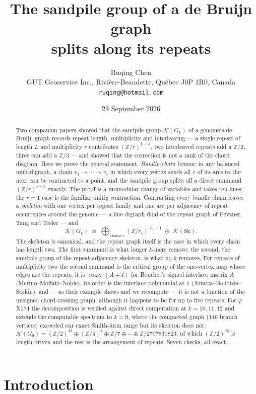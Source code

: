\documentclass[11pt]{article}
\title{\bfseries The sandpile group of a de Bruijn graph\\ splits along its repeats}
\author{Ruqing Chen\\[2pt]
\normalsize GUT Geoservice Inc., Rivi\`ere-Beaudette, Qu\'ebec J0P 1R0, Canada\\
\normalsize\texttt{ruqing@hotmail.com}}
\date{23 September 2026}
\theoremstyle{plain}
\theoremstyle{definition}
\theoremstyle{remark}
\newcommand{\Z}{\mathbb{Z}}
\newcommand{\K}{\mathcal{K}}
\newcommand{\coker}{\operatorname{coker}}
\newcommand{\Sk}{\mathrm{Sk}}
\begin{document}
\maketitle

\begin{abstract}
\noindent
Two companion papers showed that the sandpile group $\K(G_k)$ of a genome's de Bruijn
graph records repeat length, multiplicity and interleaving --- a single repeat of length
$L$ and multiplicity $r$ contributes $(\Z/r)^{L-k}$, two interleaved repeats add a $\Z/2$,
three can add a $\Z/3$ --- and showed that the correction is not a rank of the chord
diagram. Here we prove the general statement. \emph{Bundle-chain lemma:} in
any balanced multidigraph, a chain $v_1\to\cdots\to v_s$ in which every vertex sends all
$r$ of its arcs to the next can be contracted to a point, and the sandpile group splits
off a direct summand $(\Z/r)^{s-1}$ exactly. The proof is a unimodular change of
variables and takes ten lines; the $r=1$ case is the familiar unitig contraction.
Contracting every bundle chain leaves a \emph{skeleton} with one vertex per repeat family
and one arc per adjacency of repeat occurrences around the genome --- a line-digraph
dual of the repeat graph of Pevzner, Tang and Tesler --- and
\[
\K(G_k)\;\cong\;\bigoplus_{\text{chains }c}(\Z/r_c)^{\,\ell_c-1}\;\oplus\;\K(\Sk).
\]
The skeleton is canonical, and the repeat graph itself is the case in which every chain
has length two. The first summand is what longer $k$-mers remove; the second, the
sandpile group of the repeat-adjacency skeleton, is what no $k$ removes. For repeats of
multiplicity two the second summand is the critical group of the one-vertex map whose
edges are the repeats: it is $\coker(A+I)$ for Bouchet's signed interlace matrix $A$
(Merino--Moffatt--Noble), its order is the interlace polynomial at $1$
(Arratia--Bollob\'as--Sorkin), and --- as their example shows and we recompute --- it is
not a function of the unsigned chord-crossing graph, although it happens to be for up to
five repeats. For $\varphi$X174 the decomposition is
verified against direct computation at $k=10,11,12$ and extends the computable spectrum
to $k=9$, where the compacted graph ($146$ branch vertices) exceeded our exact Smith-form
range but its skeleton does not: $\K(G_9)=(\Z/2)^{42}\oplus(\Z/4)^{4}\oplus\Z/7\oplus
\cdots\oplus\Z/2707831823$, of which $(\Z/2)^{36}$ is length-driven and the rest is the
arrangement of repeats. Seven checks, all exact.
\end{abstract}

\section{Introduction}\label{sec:intro}
\end{document}
